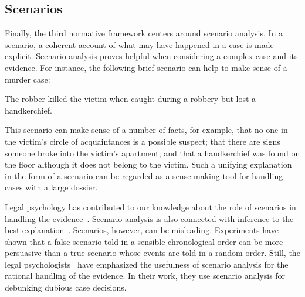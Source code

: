 \documentclass[10pt]{article}
\begin{document}
\subsection{Scenarios}
\label{sec:introScen}
Finally, the third normative framework %
centers around scenario analysis. In a scenario, a coherent account of what may have happened in a case is made explicit. %
Scenario analysis proves helpful when considering a complex case and its evidence. 
For instance, the following brief scenario can help to make sense of a murder case:
%
\begin{description}
	\item The robber killed the victim when caught during a robbery but lost a handkerchief. 	
\end{description}
%
\noindent This scenario can make sense of a number of facts, for example, that no one in the victim's circle of acquaintances 
is a possible suspect; that there are signs someone broke into the victim's apartment; and that a handkerchief 
was found on the floor although it does not belong to the victim. 
Such a unifying explanation in the form of
a scenario can be regarded as a sense-making tool for handling 
cases with a large dossier. 
%
%



Legal psychology has contributed to our knowledge about the role of scenarios in handling the evidence~\citep{bennettFeldman1981,penningtonHastie1993}. 
Scenario analysis is also connected with inference to the best explanation~\citep{pardoAllen2008}.
Scenarios, however, 
can be misleading. Experiments have shown that a false scenario told in a sensible chronological order can be more persuasive 
than a true scenario whose events are told in a random order. Still, the legal psychologists~\citet{wagenaarEtal1993} have
emphasized the usefulness of scenario analysis for the rational handling of the evidence. In their work, they use scenario analysis for 
debunking dubious case decisions. 
\end{document}
